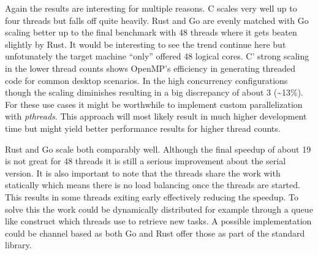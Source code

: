 Again the results are interesting for multiple reasons. C scales very well up to four threads but falls off quite heavily. Rust and Go are evenly matched with Go scaling better up to the final benchmark with 48 threads where it gets beaten slightly by Rust. It would be interesting to see the trend continue here but unfotunately the target machine ``only'' offered 48 logical cores. C' strong scaling in the lower thread counts shows OpenMP's efficiency in generating threaded code for common desktop scenarios. In the high concurrency configurations though the scaling diminishes resulting in a big discrepancy of about 3 (\textasciitilde13\%). For these use cases it might be worthwhile to implement custom parallelization with \textit{pthreads}. This approach will most likely result in much higher development time but might yield better performance results for higher thread counts.

Rust and Go scale both comparably well. Although the final speedup of about 19 is not great for 48 threads it is still a serious improvement about the serial version. It is also important to note that the threads share the work with statically which means there is no load balancing once the threads are started. This results in some threads exiting early effectively reducing the speedup. To solve this the work could be dynamically distributed for example through a queue like construct which threads use to retrieve new tasks. A possible implementation could be channel based as both Go and Rust offer those as part of the standard library.

